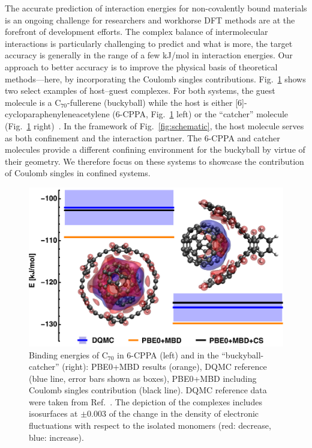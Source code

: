 \documentclass[aps,prl,groupaddress, twocolumn]{revtex4-1}  %
\begin{document}
The accurate prediction of interaction energies for non-covalently bound materials is an ongoing challenge for researchers and workhorse DFT methods are at the forefront of development efforts. The complex balance of intermolecular interactions is particularly challenging to predict and what is more, the target accuracy is generally in the range of a few kJ/mol in interaction energies. Our approach to better accuracy is to improve the physical basis of theoretical methods---here, by incorporating the Coulomb singles contributions.
Fig.~\ref{fig:flagshipsystems} shows two select examples of host--guest complexes. For both systems, the guest molecule is a C$_{70}$-fullerene (buckyball) while the host is either [6]-cycloparaphenyleneacetylene (6-CPPA, Fig.~\ref{fig:flagshipsystems} left) or the ``catcher'' molecule (Fig.~\ref{fig:flagshipsystems} right)~\cite{s12l_2013}. In the framework of Fig.~\ref{fig:schematic}, the host molecule serves as both confinement and the interaction partner. The 6-CPPA and catcher molecules provide a different confining environment for the buckyball by virtue of their geometry. We therefore focus on these systems to showcase the contribution of Coulomb singles in confined systems.
\begin{figure}[htp!]
\centering
\includegraphics[scale=0.68]{Plots/S12L4b.eps}
\caption{Binding energies of C$_{70}$ in 6-CPPA (left) and in the ``buckyball-catcher'' (right):
PBE0+MBD results (orange), DQMC reference (blue line, error bars shown as boxes), PBE0+MBD including Coulomb singles contribution (black line).
DQMC reference data were taken from Ref.~\cite{hermann_ncomm2017}.
The depiction of the complexes includes isosurfaces at $\pm$0.003 of the change in the density of electronic fluctuations with respect to the isolated monomers (red: decrease, blue: increase).
}\label{fig:flagshipsystems}
\end{figure}
\end{document}
